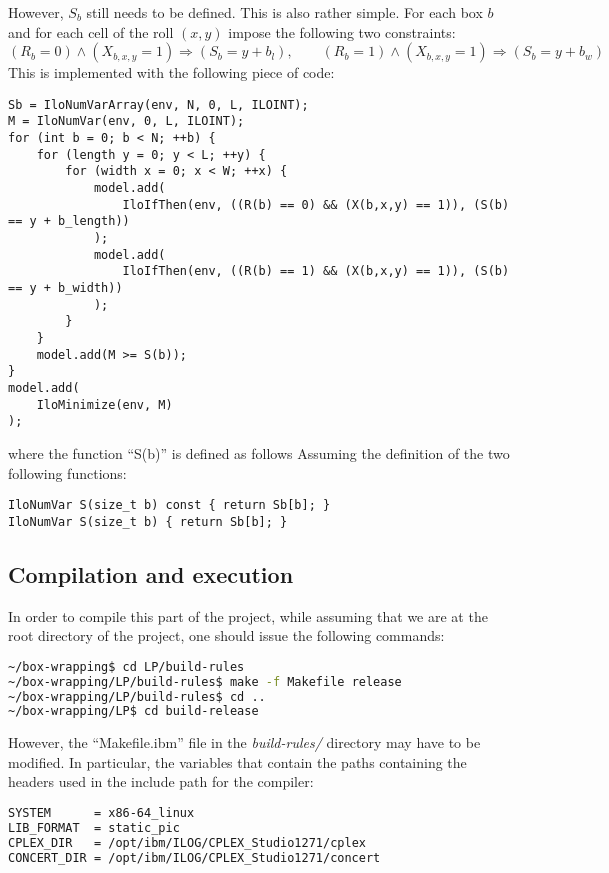 However, $S_b$ still needs to be defined. This is also rather simple. For each box $b$ and for
each cell of the roll $(x,y)$ impose the following two constraints:
\[
(R_b = 0) \wedge (X_{b,x,y} = 1) \Longrightarrow (S_b = y + b_l), \qquad
(R_b = 1) \wedge (X_{b,x,y} = 1) \Longrightarrow (S_b = y + b_w)
\]
This is implemented with the following piece of code:
{\NOINDENT \begin{lstlisting}
Sb = IloNumVarArray(env, N, 0, L, ILOINT);
M = IloNumVar(env, 0, L, ILOINT);
for (int b = 0; b < N; ++b) {
	for (length y = 0; y < L; ++y) {
		for (width x = 0; x < W; ++x) {
			model.add(
				IloIfThen(env, ((R(b) == 0) && (X(b,x,y) == 1)), (S(b) == y + b_length))
			);
			model.add(
				IloIfThen(env, ((R(b) == 1) && (X(b,x,y) == 1)), (S(b) == y + b_width))
			);
		}
	}
	model.add(M >= S(b));
}
model.add(
	IloMinimize(env, M)
);
\end{lstlisting}}
where the function ``S(b)'' is defined as follows
Assuming the definition of the two following functions:
{\NOINDENT \begin{lstlisting}
IloNumVar S(size_t b) const { return Sb[b]; }
IloNumVar S(size_t b) { return Sb[b]; }
\end{lstlisting}}

\subsection{Compilation and execution}
\label{sec:linear-programming:compilation-execution}

In order to compile this part of the project, while assuming that we are at the
root directory of the project, one should issue the following commands:
\begin{lstlisting}[language=bash]
~/box-wrapping$ cd LP/build-rules
~/box-wrapping/LP/build-rules$ make -f Makefile release
~/box-wrapping/LP/build-rules$ cd ..
~/box-wrapping/LP$ cd build-release
\end{lstlisting}

However, the ``Makefile.ibm'' file in the \textit{build-rules/} directory may have
to be modified. In particular, the variables that contain the paths containing the
headers used in the include path for the compiler:
\begin{lstlisting}[language=bash]
SYSTEM		= x86-64_linux
LIB_FORMAT	= static_pic
CPLEX_DIR	= /opt/ibm/ILOG/CPLEX_Studio1271/cplex
CONCERT_DIR	= /opt/ibm/ILOG/CPLEX_Studio1271/concert
\end{lstlisting}

